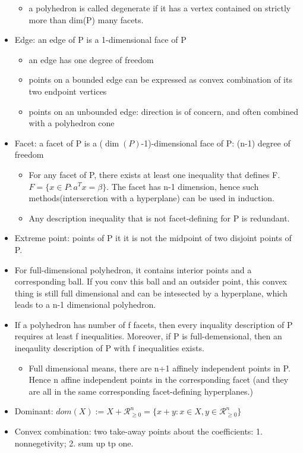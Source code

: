 \documentclass{article}
\begin{document}
\begin{itemize}
\begin{itemize}
\item a polyhedron is called degenerate if it has a vertex contained on strictly more than dim(P) many facets.
\end{itemize}
\item Edge: an edge of P is a 1-dimensional face of P
\begin{itemize}
\item an edge has one degree of freedom
\item points on a bounded edge can be expressed as convex combination of its two endpoint vertices
\item points on an unbounded edge: direction is of concern, and often combined with a polyhedron cone
\end{itemize}
\item Facet: a facet of P is a ($\dim(P)$-1)-dimensional face of P: (n-1) degree of freedom
\begin{itemize}
\item For any facet of P, there exists at least one inequality that defines F. $F = \{x\in P:a^Tx=\beta\}$. The facet has n-1 dimension, hence such methods(interserction with a hyperplane) can be used in induction.
\item Any description inequality that is not facet-defining for P is redundant.
\end{itemize}
\item Extreme point: points of P it it is not the midpoint of two disjoint points of P.
\item For full-dimensional polyhedron, it contains interior points and a corresponding ball. If you conv this ball and an outsider point, this convex thing is still full dimensional and can be intesected by a hyperplane, which leads to a n-1 dimensional polyhedron.
\item If a polyhedron has number of f facets, then every inquality description of P requires at least f inequalities. Moreover, if P is full-demensional, then an ineqaulity description of P with f inequalities exists.
\begin{itemize}
\item Full dimensional means, there are n+1 affinely independent points in P. Hence n affine independent points in the corresponding facet (and they are all in the same corresponding facet-defining hyperplanes.)
\end{itemize}
\item Dominant: $dom(X) := X+\mathcal{R}^n_{\geq 0} = \{x+y:x\in X, y\in \mathcal{R}^n_{\geq 0}\}$
\item Convex combination: two take-away points about the coefficients: 1. nonnegetivity; 2. sum up tp one.

\end{itemize}
\end{document}
